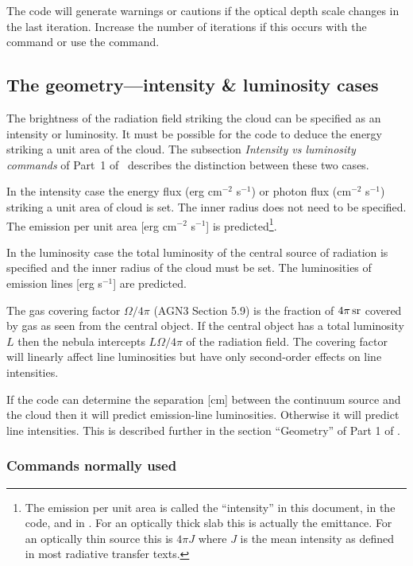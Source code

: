 \documentclass[12pt,twoside]{article}
\begin{document}
{The code will generate warnings
or cautions if the optical depth scale
changes in the last iteration.
Increase the number of iterations if this
occurs with the  command
or use the  command.

\subsection{The geometry---intensity \& luminosity cases}

The brightness of the radiation field striking the cloud can be specified as
an intensity or luminosity.
It must be possible for the code to deduce the energy
striking a unit area of the cloud.
The subsection \emph{Intensity vs luminosity commands}
of Part~1 of \Hazy\ describes the
distinction between these two cases.

In the intensity case the energy flux (erg
cm$^{-2}$ s$^{-1}$) or photon flux (cm$^{-2}$
s$^{-1}$) striking a unit area of cloud is set.
The inner radius does not need
to be specified.
The emission per unit area
[erg cm$^{-2}$ s$^{-1}$] is predicted\footnote{The emission
per unit area is called the ``intensity'' in this
document, in the code, and in \Hazy.  For an optically thick slab this is
actually the emittance.  For an optically thin source this is $4\pi J$ where
$J$ is the mean intensity as defined in most radiative transfer texts.}.

In the luminosity case the total luminosity of the central source of
radiation is specified and the inner radius of the cloud must be set.  The
luminosities of emission lines [erg s$^{-1}$] are predicted.

The gas covering factor $\Omega/4\pi$
(AGN3 Section 5.9) is the fraction of $4\pi {\rm\thinspace sr}$ covered by gas
as seen from the central object.  If the central object
has a total luminosity $L$ then the nebula
intercepts $L\Omega/4\pi$ of the radiation
field.  The covering factor will linearly affect line luminosities but have
only second-order effects on line intensities.

If the code can determine the separation [cm] between the continuum source
and the cloud then it will predict emission-line luminosities.  Otherwise
it will predict line intensities.  This is described further in the section
``Geometry'' of Part 1 of \Hazy.

\subsubsection{Commands normally used}

}
\end{document}
